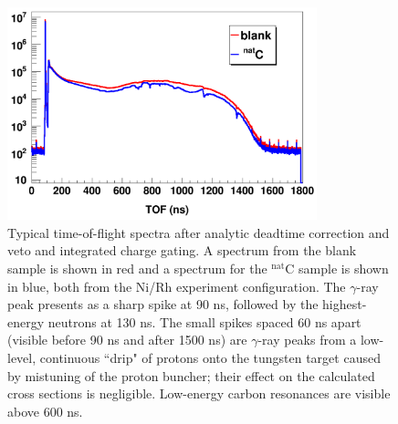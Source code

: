 \begin{figure}[h]
    \centering
    \includegraphics[width=0.8\textwidth]{figures/exampleTOFSpectrum.png}
    \caption[Typical time-of-flight spectrum after timing and deadtime corrections]
    {
        Typical time-of-flight spectra after analytic deadtime correction and
        veto and integrated charge gating. A spectrum from the blank sample is shown in
        red and a spectrum for the $^{\text{nat}}$C sample is shown in blue, both from the Ni/Rh 
        experiment configuration.
        The $\gamma$-ray peak presents as a sharp spike at 90 ns, followed by
        the highest-energy neutrons at 130 ns. The small spikes spaced 60 ns
        apart (visible before 90 ns and after 1500
        ns) are $\gamma$-ray peaks from a low-level, continuous ``drip" 
        of protons onto the tungsten target caused by mistuning of the proton 
        buncher; their effect on the calculated cross sections is negligible. Low-energy carbon
        resonances are visible above 600 ns.
    }
    \label{ExampleTOFSpectrum}
\end{figure}

